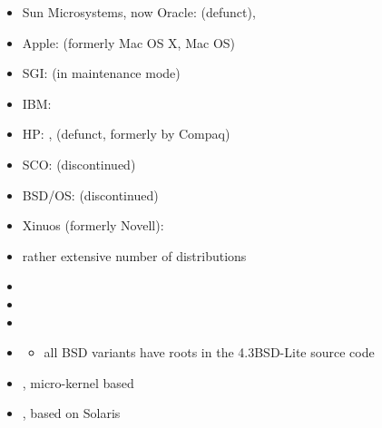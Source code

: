 
\begin{slide}
\end{slide}


\begin{slide}

\begin{itemize}
\item Sun Microsystems, now Oracle:  (defunct), 
\item Apple:  (formerly Mac OS X, Mac OS)
\item SGI:  (in maintenance mode)
\item IBM: 
\item HP: ,  (defunct, formerly by Compaq)
\item SCO:  (discontinued)
\item BSD/OS:  (discontinued)
\item Xinuos (formerly Novell): 
\end{itemize}
\end{slide}

\begin{slide}

\begin{itemize}
\item rather extensive number of  distributions
\item {}
\item {}
\item {}
\item {}
\begin{itemize}
\item all BSD variants have roots in the 4.3BSD-Lite source code
\end{itemize}
\item {}, micro-kernel based
\item {}, based on Solaris
\end{itemize}
\end{slide}

